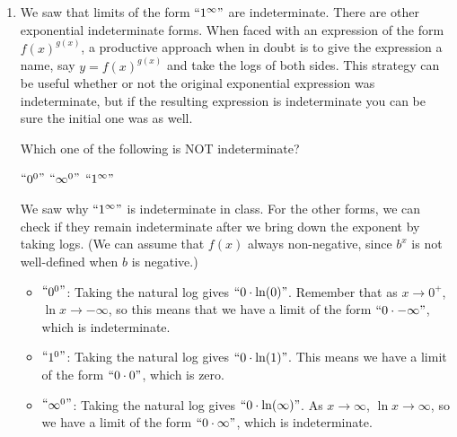 \documentclass[main]{subfiles}
\begin{document}
\begin{enumerate}
\item We saw that limits of the form   $\mquote{1^\infty}$ are indeterminate. There are other exponential indeterminate forms. When faced with an expression of the form $\displaystyle{f(x)}^{g(x)}$, a productive approach when in doubt is to give the expression a name, say $y = \displaystyle {f(x)}^{g(x)}$ and take the logs of both sides. This strategy can be useful whether or not the original exponential expression was indeterminate, but if the resulting expression is indeterminate you can be sure the initial one was as well.

Which one of the following is NOT indeterminate?

    \hfill $\mquote{0^0}$
    \hfill {}
    \hfill $\mquote{\infty^0}$
    \hfill $\mquote{1^\infty}$
    \hfill \null

\begin{solution}
    We saw why $\mquote{1^\infty}$ is indeterminate in class. For the other forms,
    we can check if they remain indeterminate after we bring down the exponent
    by taking logs. (We can
    assume that $f(x)$ always non-negative, since $b^x$ is not well-defined when
    $b$ is negative.)
    \begin{itemize}
        \item $\mquote{0^0}$: Taking the natural log gives $\mquote{0\cdot\ln(0)}$.
        Remember that as $x\to0^+$, $\ln x \to -\infty$, so this means that we have
        a limit of the form $\mquote{0 \cdot -\infty}$, which is indeterminate.

        \item $\mquote{1^0}$: Taking the natural log gives $\mquote{0\cdot\ln(1)}$.
        This means we have a limit of the form $\mquote{0\cdot0}$, which is zero.

        \item $\mquote{\infty^0}$: Taking the natural log gives 
        $\mquote{0\cdot\ln(\infty)}$. As $x\to\infty$, $\ln x \to \infty$, so we
        have a limit of the form $\mquote{0 \cdot \infty}$, which is indeterminate.
    \end{itemize}
\end{solution}

\end{enumerate}
\end{document}
